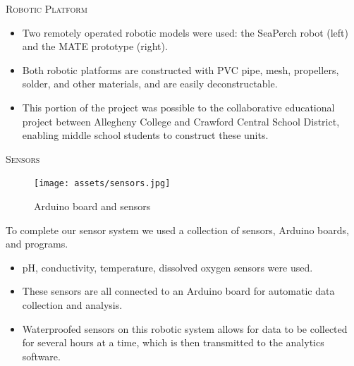 \documentclass[final,t]{beamer}
\begin{document}
\begin{frame}{}
\begin{columns}
\begin{column}{.5\linewidth}
\begin{block}{\textsc{Robotic Platform}}
                    \begin{itemize}
                    	\item Two remotely operated robotic models were used: the SeaPerch robot (left) and the MATE prototype (right). 
                    	\item Both robotic platforms are constructed with PVC pipe, mesh, propellers, solder, and other materials, and are easily deconstructable.
                    	\item This portion of the project was possible to the collaborative educational project between Allegheny College and Crawford Central School District, enabling middle school students to construct these units.
                    \end{itemize}
                    
                    \vspace*{3mm}
                \end{block}
                \begin{block}{\textsc{Sensors}}
                    \vspace*{3mm}
                    
                    \begin{figure}
                        \centering
                        \texttt{[image: assets/sensors.jpg]}
                        \caption{Arduino board and sensors}
                    \end{figure}
                    To complete our sensor system we used a collection of sensors, Arduino boards, and programs. 
                    \begin{itemize}
                    	\item pH, conductivity, temperature, dissolved oxygen sensors were used. 
                     
                    	\item These sensors are all connected to an Arduino board for automatic data collection and analysis. 
                     	\item Waterproofed sensors on this robotic system allows for data to be collected for several hours at a time, which is then transmitted to the analytics software.
                     \end{itemize}
                     

\end{block}
\end{column}
\end{columns}
\end{frame}
\end{document}
